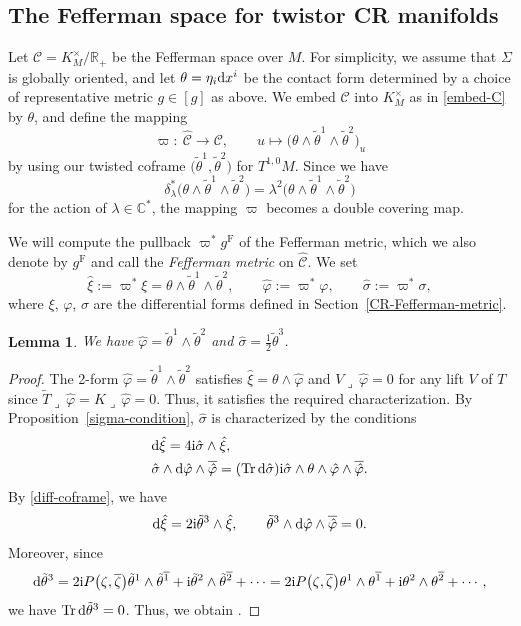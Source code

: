 \documentclass[11pt]{article}
\numberwithin{equation}{section}
\renewcommand\a{\alpha}
\renewcommand\b{\beta}
\renewcommand\d{\delta}
\renewcommand\th{\theta}
\newcommand\ol{\overline}
\newcommand{\wh}{\widehat}
\numberwithin{equation}{section}
\newtheorem{Lemma}[Theorem]{Lemma}
\begin{document}
\subsection{The Fefferman space for twistor CR manifolds}
Let $\mathcal{C}=K_M^\times/\mathbb{R}_+$ be the Fefferman space over $M$. For simplicity, we assume that $\Sigma$ is globally oriented, and let $\th=\eta_i{\rm d}x^i$ be the contact form determined by a choice of representative metric $g\in[g]$ as above.
We embed $\mathcal{C}$ into $K^\times_M$ as in \eqref{embed-C} by $\th$, and define the mapping
\[
\varpi\colon \ \wh{\mathcal{C}}\longrightarrow \mathcal{C}, \qquad u\longmapsto \bigl(\theta\wedge\tilde\theta^1\wedge\tilde\theta^2\bigr)_u
\]
by using our twisted coframe $\bigl(\tilde\th^1, \tilde\th^2\bigr)$ for $T^{1, 0}M$. %
Since we have
\[
\d_\lambda^*\bigl(\theta\wedge\tilde\theta^1\wedge\tilde\theta^2\bigr)
=\lambda^2\bigl(\theta\wedge\tilde\theta^1\wedge\tilde\theta^2\bigr)
\]
for the action of $\lambda\in\mathbb{C}^*$, the mapping $\varpi$ becomes a double covering map.

We will compute the pullback $\varpi^*g^{\mathrm{F}}$ of the Fefferman metric, which we also denote by $g^{\mathrm{F}}$ and call the {\it Fefferman metric} on $\wh{\mathcal{C}}$. We set
\[
\hat{\xi}:=\varpi^*\xi=\theta\wedge\tilde\theta^1\wedge\tilde\theta^2,\qquad \hat{\varphi}:=\varpi^*\varphi, \qquad \hat{\sigma}:=\varpi^*\sigma,
\]
where $\xi$, $\varphi$, $\sigma$ are the differential forms defined in Section~\ref{CR-Fefferman-metric}.
\begin{Lemma}
We have $\hat\varphi=\tilde\theta^1\wedge\tilde\theta^2$ and $\hat\sigma=\frac{1}{2}\tilde\th^3$.
\end{Lemma}
\begin{proof}
The 2-form $\hat\varphi=\tilde\theta^1\wedge\tilde\theta^2$ satisfies
$\hat\xi=\th\wedge\hat\varphi$ and $V\lrcorner\,\hat\varphi=0$ for any lift $V$ of $T$ since $\tilde T\lrcorner\,\hat\varphi= K\lrcorner\,\hat\varphi=0$. Thus, it satisfies the required characterization. By Proposition~\ref{sigma-condition}, $\hat\sigma$ is characterized by the conditions
\begin{align*}
&{\rm d}\hat\xi=4{\rm i}\hat\sigma\wedge\hat\xi, \\
&\hat\sigma\wedge {\rm d}\hat\varphi\wedge\ol{\hat\varphi}=(\operatorname{Tr} {\rm d}\hat\sigma){\rm i}\hat\sigma\wedge\th\wedge\hat\varphi\wedge\ol{\hat\varphi}.
\end{align*}
By \eqref{diff-coframe}, we have
\[
{\rm d}\hat\xi=2{\rm i}\tilde\theta^3\wedge\hat\xi, \qquad
\tilde\theta^3\wedge {\rm d}\hat\varphi\wedge \ol{\hat\varphi}=0.
\]
Moreover, since
\begin{align*}
{\rm d}\tilde\theta^3 =2{\rm i}P\bigl(\zeta, \ol\zeta\bigr)\tilde\theta^1\wedge\tilde\theta^{\ol1}+{\rm i}\tilde\theta^2\wedge\tilde\theta^{\ol2}+\cdots
 =2{\rm i}P\bigl(\zeta, \ol\zeta\bigr)\theta^1\wedge\theta^{\ol1}+{\rm i}\theta^2\wedge\theta^{\ol2}+\cdots,
\end{align*}
we have $\operatorname{Tr}{\rm d}\tilde\theta^3=0$. Thus, we obtain .
\end{proof}
\end{document}

